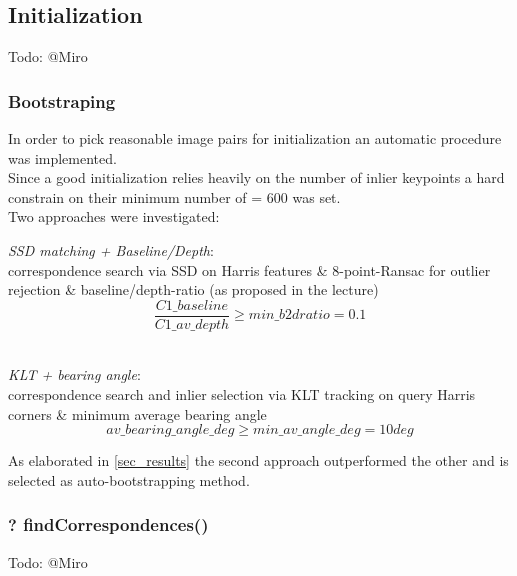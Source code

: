 \subsection{Initialization}
\label{sec_init}
Todo: @Miro

\subsubsection{Bootstraping}
\label{sec_boot}
In order to pick reasonable image pairs for initialization an automatic procedure was implemented.\\
Since a good initialization relies heavily on the number of inlier keypoints a hard constrain on their minimum number of  = $600$ was set.\\

Two approaches were investigated:
\begin{compactitem}
	\item \textit{SSD matching + Baseline/Depth}:\\
	correspondence search via SSD on Harris features \& 8-point-Ransac for outlier rejection \& baseline/depth-ratio (as proposed in the lecture)\\
	\begin{equation}
		\frac{C1\_baseline}{C1\_av\_depth} \geqslant min\_b2dratio = 0.1
	\end{equation}\\
	
	\item \textit{KLT + bearing angle}:\\
	correspondence search and inlier selection via KLT tracking on query Harris corners \& minimum average bearing angle\\
	\begin{equation}
		av\_bearing\_angle\_deg \geqslant min\_av\_angle\_deg = 10 deg
	\end{equation}
\end{compactitem}

As elaborated in \cref{sec_results} the second approach outperformed the other and is selected as auto-bootstrapping method.


\subsubsection{? findCorrespondences()}
Todo: @Miro

